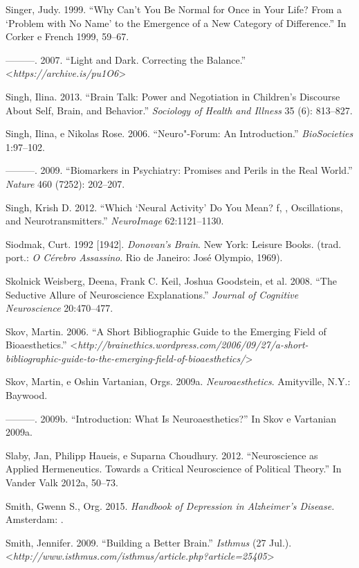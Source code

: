 Singer, Judy. 1999. ``Why Can't You Be Normal for Once in Your Life?
From a `Problem with No Name' to the Emergence of a New Category of
Difference.'' In Corker e French 1999, 59--67.

---------. 2007. ``Light and Dark. Correcting the Balance.''
\textless{}\emph{https://archive.is/pu1O6}\textgreater{}

Singh, Ilina. 2013. ``Brain Talk: Power and Negotiation in Children's
Discourse About Self, Brain, and Behavior.'' \emph{Sociology of Health
and Illness} 35 (6): 813--827.

Singh, Ilina, e Nikolas Rose. 2006. ``Neuro"-Forum: An Introduction.''
\emph{BioSocieties} 1:97--102.

---------. 2009. ``Biomarkers in Psychiatry: Promises and Perils in the
Real World.'' \emph{Nature} 460 (7252): 202--207.

Singh, Krish D. 2012. ``Which `Neural Activity' Do You Mean? f, ,
Oscillations, and Neurotransmitters.'' \emph{NeuroImage} 62:1121--1130.

Siodmak, Curt. 1992 {[}1942{]}. \emph{Donovan's Brain}. New York:
Leisure Books. (trad. port.: \emph{O Cérebro Assassino}. Rio de Janeiro:
José Olympio, 1969).

Skolnick Weisberg, Deena, Frank C. Keil, Joshua Goodstein, et al. 2008.
``The Seductive Allure of Neuroscience Explanations.'' \emph{Journal of
Cognitive Neuroscience} 20:470--477.

Skov, Martin. 2006. ``A Short Bibliographic Guide to the Emerging Field
of Bioaesthetics.''
\textless{}\emph{http://brainethics.wordpress.com/2006/09/27/a-short-bibliographic-guide-to-the-emerging-field-of-bioaesthetics/}\textgreater{}

Skov, Martin, e Oshin Vartanian, Orgs. 2009a. \emph{Neuroaesthetics}.
Amityville, N.Y.: Baywood.

---------. 2009b. ``Introduction: What Is Neuroaesthetics?'' In Skov e
Vartanian 2009a.

Slaby, Jan, Philipp Haueis, e Suparna Choudhury. 2012. ``Neuroscience as
Applied Hermeneutics. Towards a Critical Neuroscience of Political
Theory.'' In Vander Valk 2012a, 50--73.

Smith, Gwenn S., Org. 2015. \emph{Handbook of Depression in Alzheimer's
Disease.} Amsterdam: .

Smith, Jennifer. 2009. ``Building a Better Brain.'' \emph{Isthmus} (27
Jul.). \textless{}\emph{http://www.isthmus.com/isthmus/article.php?article​=25405}\textgreater{}


